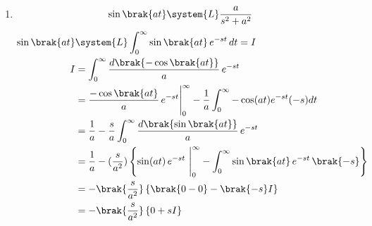 \begin{enumerate}[label=\thesubsection.\arabic*,ref=\thesubsection.\theenumi]
\solution
\begin{align}
    \cos(at)&\system{L}\int_{0}^{\infty}\cos\brak{at}\,e^{-st}\,dt=I\\
                          I&=\int_{0}^{\infty}\frac{d\brak{\sin\brak{at}}}{a}\,e^{-st}\\
                           &=\frac{\sin\brak{at}}{a}\,e^{-st}\Bigg|_0^\infty-\frac{1}{a}\int_{0}^{\infty}\sin(at)e^{-st}\brak{-s}dt\\
                           &=0+\frac{s}{a}\int_0^\infty \frac{d\brak{-\cos\brak{at}}}{a}\,e^{-st}\\
                           &=-\brak{\frac{s}{a^2}}\left\{\cos\brak{at}\,e^{-st}\,\,\Bigg|_0^\infty-\int_0^\infty\cos\brak{at}\,e^{-st}\,\brak{-s}\right\}\\
                           &=-\brak{\frac{s}{a^2}}\left\{\brak{0-1}-\brak{-s}I\right\}\\
                           &=-\brak{\frac{s}{a^2}}\left\{-1+sI\right\}\\
                          I&=\frac{s}{a^2}-\frac{s^2}{a^2}\brak{I}\\
       \brak{\frac{a^2+s^2}{a^2}}I&=\frac{s}{a^2}\\
                          I&=\frac{s}{s^2+a^2}
\end{align}
\item
\begin{align}
\sin\brak{at}&\system{L}\frac{a}{s^2+a^2}\label{eq:laplacesin}
\end{align}
\solution
\begin{align}
    \sin\brak{at}&\system{L}\int_{0}^{\infty}\sin\brak{at}\,e^{-st}\,dt=I\\
                          I&=\int_{0}^{\infty}\frac{d\brak{-\cos\brak{at}}}{a}\,e^{-st}\\
                           &=\frac{-\cos\brak{at}}{a}\,e^{-st}\Bigg|_0^\infty-\frac{1}{a}\int_{0}^{\infty}-\cos(at)e^{-st}(-s)dt\\
                           &=\frac{1}{a}-\frac{s}{a}\int_0^\infty \frac{d\brak{\sin\brak{at}}}{a}\,e^{-st}\\
                           &=\frac{1}{a}-(\frac{s}{a^2})\left\{\sin(at)\,e^{-st}\,\,\Bigg|_0^\infty-\int_0^\infty\sin\brak{at}\,e^{-st}\,\brak{-s}\right\}\\
                           &=-\brak{\frac{s}{a^2}}\left\{\brak{0-0}-\brak{-s}I\right\}\\
                           &=-\brak{\frac{s}{a^2}}\left\{0+sI\right\}\\

\end{align}
\end{enumerate}
